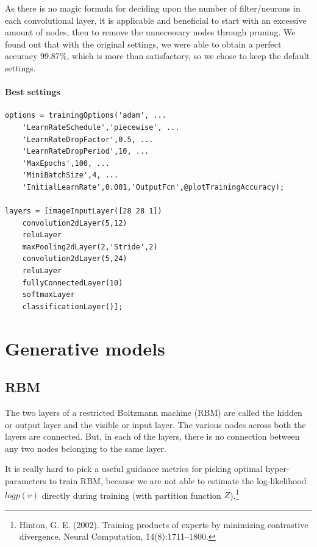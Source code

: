 \documentclass{article}
\begin{document}
As there is no magic formula for deciding upon the number of filter/neurons in each convolutional layer, it is applicable and beneficial to start with an excessive amount of nodes, then to remove the unnecessary nodes through pruning. We found out that with the original settings, we were able to obtain a perfect accuracy 99.87\%, which is more than satisfactory, so we chose to keep the default settings.

\paragraph{Best settings}

\begin{verbatim}
options = trainingOptions('adam', ...
    'LearnRateSchedule','piecewise', ...
    'LearnRateDropFactor',0.5, ...
    'LearnRateDropPeriod',10, ...
    'MaxEpochs',100, ...
    'MiniBatchSize',4, ...
    'InitialLearnRate',0.001,'OutputFcn',@plotTrainingAccuracy);
    
layers = [imageInputLayer([28 28 1])
    convolution2dLayer(5,12)
    reluLayer
    maxPooling2dLayer(2,'Stride',2)
    convolution2dLayer(5,24)
    reluLayer  
    fullyConnectedLayer(10)
    softmaxLayer
    classificationLayer()];
\end{verbatim}

\section{Generative models}

\subsection{RBM}
The two layers of a restricted Boltzmann machine (RBM) are called the hidden or output layer and the visible or input layer. The various nodes across both the layers are connected. But, in each of the layers, there is no connection between any two nodes belonging to the same layer.

It is really hard to pick a useful guidance metrics for picking optimal hyper-parameters to train RBM, because we are not able to estimate the log-likelihood $log p(v)$ directly during training (with partition function $Z$).\footnote{Hinton, G. E. (2002). Training products of experts by minimizing contrastive divergence. Neural Computation, 14(8):1711–1800.}
\end{document}
